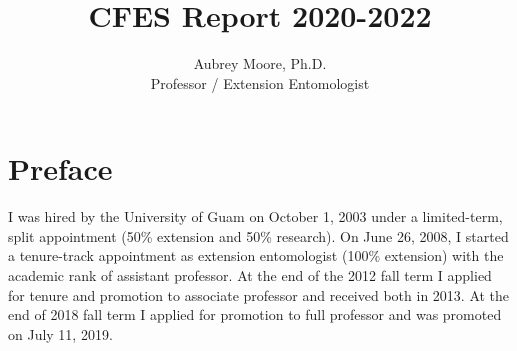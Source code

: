 


\nocite{*}

\usepackage[breaklinks=true, colorlinks=True, allcolors=blue]{hyperref}

\usepackage{indentfirst} 
\usepackage{comment}

\newcommand{\activities}{\medskip\textbf{Activities}}
\newcommand{\plans}{\medskip\textbf{Plans}}

\makeatletter

\makeatother




\title{CFES Report 2020-2022}

\author{Aubrey Moore, Ph.D.\\
Professor / Extension Entomologist}

\maketitle



\setcounter{tocdepth}{2}
\tableofcontents{}

\clearpage

\section{Preface}
	
I was hired by the University of Guam on October 1, 2003 under a limited-term,
split appointment (50\% extension and 50\% research). On June 26,
2008, I started a tenure-track appointment as extension entomologist
(100\% extension) with the academic rank of assistant professor. At
the end of the 2012 fall term I applied for tenure and promotion to associate professor and
received both in 2013. At the end of 2018 fall term I applied for promotion to
full professor and was promoted on July 11, 2019. 

